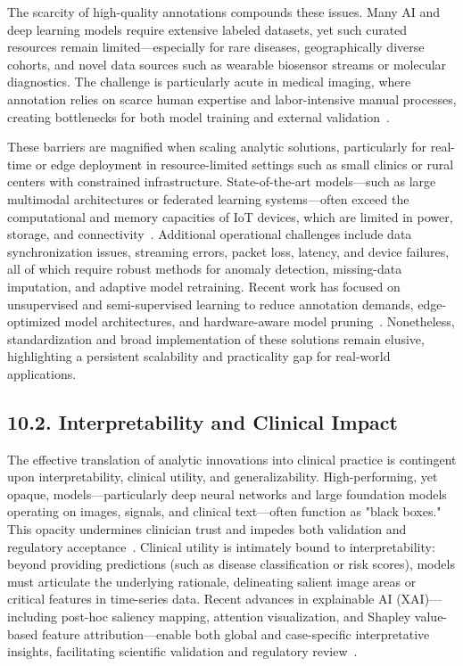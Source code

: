\documentclass[11pt]{article}
\begin{document}
The scarcity of high-quality annotations compounds these issues. Many AI and deep learning models require extensive labeled datasets, yet such curated resources remain limited—especially for rare diseases, geographically diverse cohorts, and novel data sources such as wearable biosensor streams or molecular diagnostics. The challenge is particularly acute in medical imaging, where annotation relies on scarce human expertise and labor-intensive manual processes, creating bottlenecks for both model training and external validation~\cite{ref54,ref53,ref55,ref65,ref66}.

These barriers are magnified when scaling analytic solutions, particularly for real-time or edge deployment in resource-limited settings such as small clinics or rural centers with constrained infrastructure. State-of-the-art models—such as large multimodal architectures or federated learning systems—often exceed the computational and memory capacities of IoT devices, which are limited in power, storage, and connectivity~\cite{ref16,ref37,ref46,ref54,ref57,ref61,ref70,ref71,ref72,ref73,ref74,ref75,ref76,ref78,ref83,ref90,ref106}. Additional operational challenges include data synchronization issues, streaming errors, packet loss, latency, and device failures, all of which require robust methods for anomaly detection, missing-data imputation, and adaptive model retraining. Recent work has focused on unsupervised and semi-supervised learning to reduce annotation demands, edge-optimized model architectures, and hardware-aware model pruning~\cite{ref28,ref51,ref54,ref56,ref61,ref66,ref72,ref78,ref102}. Nonetheless, standardization and broad implementation of these solutions remain elusive, highlighting a persistent scalability and practicality gap for real-world applications.

\subsection{10.2. Interpretability and Clinical Impact}

The effective translation of analytic innovations into clinical practice is contingent upon interpretability, clinical utility, and generalizability. High-performing, yet opaque, models—particularly deep neural networks and large foundation models operating on images, signals, and clinical text—often function as "black boxes." This opacity undermines clinician trust and impedes both validation and regulatory acceptance~\cite{ref11,ref32,ref36,ref39,ref46,ref50,ref53,ref54,ref65,ref68,ref70,ref72,ref73,ref78,ref80,ref87,ref90,ref98,ref99,ref106}. Clinical utility is intimately bound to interpretability: beyond providing predictions (such as disease classification or risk scores), models must articulate the underlying rationale, delineating salient image areas or critical features in time-series data. Recent advances in explainable AI (XAI)—including post-hoc saliency mapping, attention visualization, and Shapley value-based feature attribution—enable both global and case-specific interpretative insights, facilitating scientific validation and regulatory review~\cite{ref11,ref36,ref54,ref72,ref78,ref80,ref98,ref99}.
\end{document}
